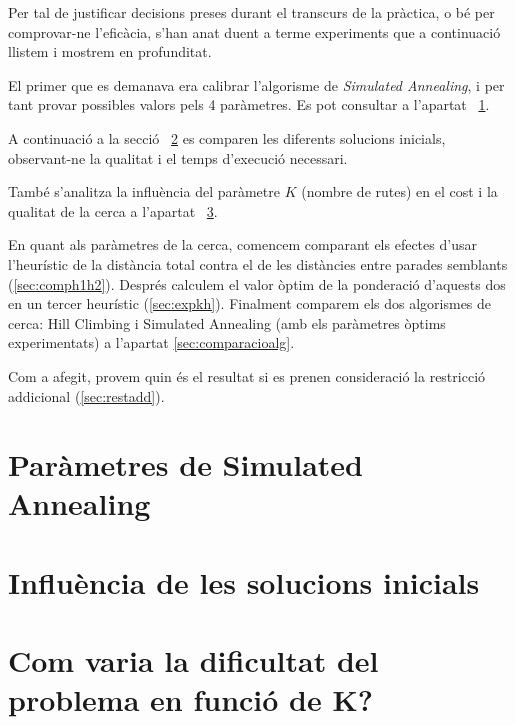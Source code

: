 
Per tal de justificar decisions preses durant el transcurs de la pràctica, o bé per comprovar-ne l'eficàcia, s'han anat duent a terme experiments que a continuació llistem i mostrem en profunditat.

El primer que es demanava era calibrar l'algorisme de \emph{Simulated Annealing}, i per tant provar possibles valors pels 4 paràmetres. Es pot consultar a l'apartat ~\ref{sec:expSA}.

A continuació a la secció ~\ref{sec:expsolini}
 es comparen les diferents solucions inicials, observant-ne la qualitat i el temps d'execució necessari.

També s'analitza la influència del paràmetre $K$ (nombre de rutes) en el cost i la qualitat de la cerca a l'apartat ~\ref{sec:expk}.

En quant als paràmetres de la cerca, comencem comparant els efectes d'usar l'heurístic de la distància total contra el de les distàncies entre parades semblants (\ref{sec:comph1h2}). Després calculem el valor òptim de la ponderació d'aquests dos en un tercer heurístic (\ref{sec:expkh}). Finalment comparem els dos algorismes de cerca: Hill Climbing i Simulated Annealing (amb els paràmetres òptims experimentats) a l'apartat \ref{sec:comparacioalg}.

Com a afegit, provem quin és el resultat si es prenen consideració la restricció addicional (\ref{sec:restadd}).


\newpage
\section{Paràmetres de Simulated Annealing} %
\label{sec:expSA}


\section{Influència de les solucions inicials} %
\label{sec:expsolini}

	
\newpage
\section{Com varia la dificultat del problema en funció de K?} %
\label{sec:expk}




\newpage
